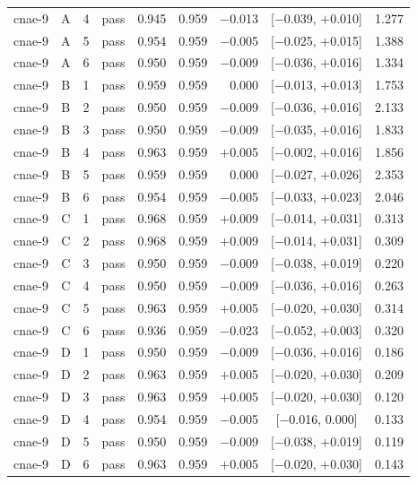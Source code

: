{\begin{longtable}{lccl rrrcr}
cnae-9 & A & 4 & pass & 0.945 & 0.959 & $-$0.013 & [$-$0.039, $+$0.010] & 1.277 \\
cnae-9 & A & 5 & pass & 0.954 & 0.959 & $-$0.005 & [$-$0.025, $+$0.015] & 1.388 \\
cnae-9 & A & 6 & pass & 0.950 & 0.959 & $-$0.009 & [$-$0.036, $+$0.016] & 1.334 \\
\addlinespace[2pt]
cnae-9 & B & 1 & pass & 0.959 & 0.959 & 0.000 & [$-$0.013, $+$0.013] & 1.753 \\
cnae-9 & B & 2 & pass & 0.950 & 0.959 & $-$0.009 & [$-$0.036, $+$0.016] & 2.133 \\
cnae-9 & B & 3 & pass & 0.950 & 0.959 & $-$0.009 & [$-$0.035, $+$0.016] & 1.833 \\
cnae-9 & B & 4 & pass & 0.963 & 0.959 & $+$0.005 & [$-$0.002, $+$0.016] & 1.856 \\
cnae-9 & B & 5 & pass & 0.959 & 0.959 & 0.000 & [$-$0.027, $+$0.026] & 2.353 \\
cnae-9 & B & 6 & pass & 0.954 & 0.959 & $-$0.005 & [$-$0.033, $+$0.023] & 2.046 \\
\addlinespace[2pt]
cnae-9 & C & 1 & pass & 0.968 & 0.959 & $+$0.009 & [$-$0.014, $+$0.031] & 0.313 \\
cnae-9 & C & 2 & pass & 0.968 & 0.959 & $+$0.009 & [$-$0.014, $+$0.031] & 0.309 \\
cnae-9 & C & 3 & pass & 0.950 & 0.959 & $-$0.009 & [$-$0.038, $+$0.019] & 0.220 \\
cnae-9 & C & 4 & pass & 0.950 & 0.959 & $-$0.009 & [$-$0.036, $+$0.016] & 0.263 \\
cnae-9 & C & 5 & pass & 0.963 & 0.959 & $+$0.005 & [$-$0.020, $+$0.030] & 0.314 \\
cnae-9 & C & 6 & pass & 0.936 & 0.959 & $-$0.023 & [$-$0.052, $+$0.003] & 0.320 \\
\addlinespace[2pt]
cnae-9 & D & 1 & pass & 0.950 & 0.959 & $-$0.009 & [$-$0.036, $+$0.016] & 0.186 \\
cnae-9 & D & 2 & pass & 0.963 & 0.959 & $+$0.005 & [$-$0.020, $+$0.030] & 0.209 \\
cnae-9 & D & 3 & pass & 0.963 & 0.959 & $+$0.005 & [$-$0.020, $+$0.030] & 0.120 \\
cnae-9 & D & 4 & pass & 0.954 & 0.959 & $-$0.005 & [$-$0.016, 0.000] & 0.133 \\
cnae-9 & D & 5 & pass & 0.950 & 0.959 & $-$0.009 & [$-$0.038, $+$0.019] & 0.119 \\
cnae-9 & D & 6 & pass & 0.963 & 0.959 & $+$0.005 & [$-$0.020, $+$0.030] & 0.143 \\

\end{longtable}}
